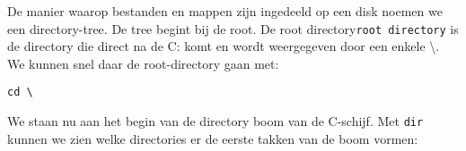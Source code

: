 De manier waarop bestanden en mappen zijn ingedeeld op een disk noemen we een directory-tree. De tree begint bij de root. De root directory\texttt{root directory} is de directory die direct na de C: komt en wordt weergegeven door een enkele \textbackslash. We kunnen snel daar de root-directory gaan met:
\begin{lstlisting}[style=DOS]
cd \
\end{lstlisting}
We staan nu aan het begin van de directory boom van de C-schijf. Met \texttt{dir} kunnen we zien welke directories er de eerste takken van de boom vormen:

\begin{minipage}[t]{\linewidth}
\raggedright
{}
\end{minipage}
